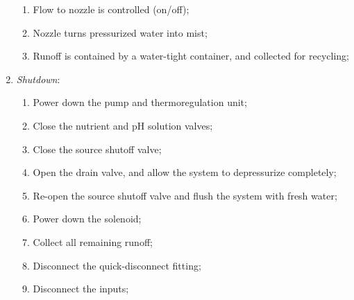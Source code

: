 \begin{enumerate}
\begin{enumerate}
        \item Flow to nozzle is controlled (on/off);
        \item Nozzle turns pressurized water into mist;
        \item Runoff is contained by a water-tight container, and collected for recycling;
    \end{enumerate}
    \clearpage
    \item \textit{Shutdown}:
    \begin{enumerate}
        \item Power down the pump and thermoregulation unit;
        \item Close the nutrient and pH solution valves;
        \item Close the source shutoff valve;
        \item Open the drain valve, and allow the system to depressurize completely;
        \item Re-open the source shutoff valve and flush the system with fresh water;
        \item Power down the solenoid;
        \item Collect all remaining runoff;
        \item Disconnect the quick-disconnect fitting;
        \item Disconnect the inputs;
    \end{enumerate}
\end{enumerate}

